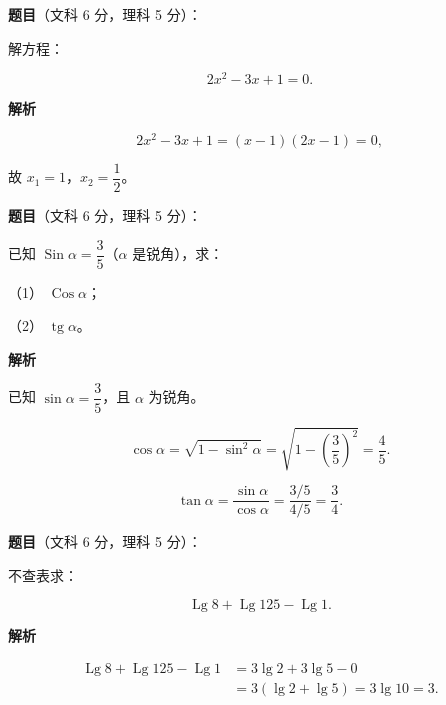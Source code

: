 \begin{answer}

\textbf{题目}（文科 6 分，理科 5 分）：

解方程：

\nopagebreak[4]
\[
2x^2-3x+1=0.
\]

\textbf{解析}

\nopagebreak[4]
\[
2x^2-3x+1=(x-1)(2x-1)=0,
\]

故 $x_1=1$，$x_2=\dfrac12$。


\end{answer}
\begin{answer}

\textbf{题目}（文科 6 分，理科 5 分）：

已知 $\operatorname{Sin}\alpha=\dfrac35$（$\alpha$ 是锐角），求：

（1） $\operatorname{Cos}\alpha$；

（2） $\operatorname{tg}\alpha$。

\textbf{解析}

已知 $\sin\alpha=\dfrac35$，且 $\alpha$ 为锐角。


\nopagebreak[4]
\[
\cos\alpha=\sqrt{1-\sin^2\alpha}
=\sqrt{1-\left(\frac35\right)^2}
=\frac45.
\]


\nopagebreak[4]
\[
\tan\alpha=\frac{\sin\alpha}{\cos\alpha}
=\dfrac{3/5}{4/5}
=\frac34.
\]



\end{answer}
\begin{answer}

\textbf{题目}（文科 6 分，理科 5 分）：

不查表求：

\nopagebreak[4]
\[
\operatorname{Lg}8+\operatorname{Lg}125-\operatorname{Lg}1.
\]

\textbf{解析}

\nopagebreak[4]
\[
\begin{aligned}
\operatorname{Lg}8+\operatorname{Lg}125-\operatorname{Lg}1
&=3\lg2+3\lg5-0\\
&=3(\lg2+\lg5)=3\lg10=3.
\end{aligned}
\]


\end{answer}
